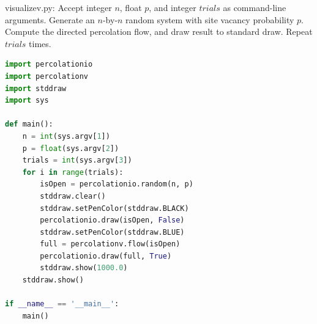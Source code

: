 \documentclass[8pt,a4paper,compress,handout]{beamer}
\begin{document}
\begin{frame}[fragile]
\begin{framed}
\tiny visualizev.py: Accept integer $n$, float $p$, and integer $trials$ as command-line arguments. Generate an $n$-by-$n$ random system with site vacancy probability $p$. Compute the directed percolation flow, and draw result to standard draw. Repeat $trials$ times.
\end{framed}

\begin{lstlisting}[language=Python]
import percolationio
import percolationv
import stddraw
import sys

def main():
    n = int(sys.argv[1])
    p = float(sys.argv[2])
    trials = int(sys.argv[3])
    for i in range(trials):
        isOpen = percolationio.random(n, p)
        stddraw.clear()
        stddraw.setPenColor(stddraw.BLACK)
        percolationio.draw(isOpen, False)
        stddraw.setPenColor(stddraw.BLUE)
        full = percolationv.flow(isOpen)
        percolationio.draw(full, True)
        stddraw.show(1000.0)
    stddraw.show()

if __name__ == '__main__':
    main()
\end{lstlisting}
\end{frame}
\end{document}
